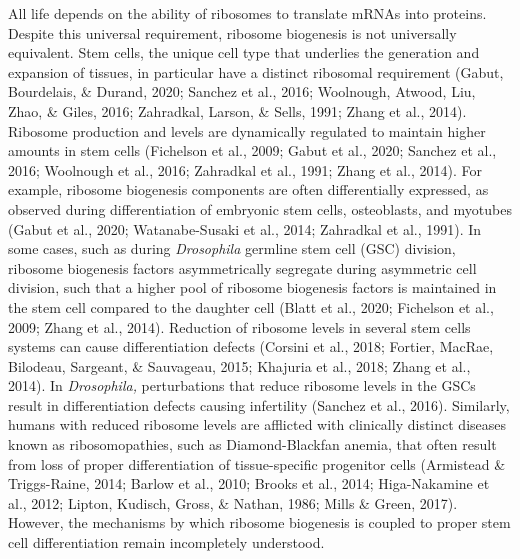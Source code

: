 \documentclass[12pt,twoside]{reedthesis}
\begin{document}
All life depends on the ability of ribosomes to translate mRNAs into
proteins. Despite this universal requirement, ribosome biogenesis is not
universally equivalent. Stem cells, the unique cell type that underlies
the generation and expansion of tissues, in particular have a distinct
ribosomal requirement (Gabut, Bourdelais, \& Durand, 2020; Sanchez et al., 2016; Woolnough, Atwood, Liu, Zhao, \& Giles, 2016; Zahradkal, Larson, \& Sells, 1991; Zhang et al., 2014). Ribosome
production and levels are dynamically regulated to maintain higher
amounts in stem cells (Fichelson et al., 2009; Gabut et al., 2020; Sanchez et al., 2016; Woolnough et al., 2016; Zahradkal et al., 1991; Zhang et al., 2014). For
example, ribosome biogenesis components are often differentially
expressed, as observed during differentiation of embryonic stem cells,
osteoblasts, and myotubes (Gabut et al., 2020; Watanabe-Susaki et al., 2014; Zahradkal et al., 1991). In
some cases, such as during \emph{Drosophila} germline stem cell (GSC)
division, ribosome biogenesis factors asymmetrically segregate during
asymmetric cell division, such that a higher pool of ribosome biogenesis
factors is maintained in the stem cell compared to the daughter cell
(Blatt et al., 2020; Fichelson et al., 2009; Zhang et al., 2014). Reduction of ribosome levels in several stem cells
systems can cause differentiation defects
(Corsini et al., 2018; Fortier, MacRae, Bilodeau, Sargeant, \& Sauvageau, 2015; Khajuria et al., 2018; Zhang et al., 2014). In \emph{Drosophila,} perturbations that reduce ribosome
levels in the GSCs result in differentiation defects causing infertility
(Sanchez et al., 2016). Similarly, humans with reduced ribosome levels are
afflicted with clinically distinct diseases known as ribosomopathies,
such as Diamond-Blackfan anemia, that often result from loss of proper
differentiation of tissue-specific progenitor cells (Armistead \& Triggs-Raine, 2014; Barlow et al., 2010; Brooks et al., 2014; Higa-Nakamine et al., 2012; Lipton, Kudisch, Gross, \& Nathan, 1986; Mills \& Green, 2017). However, the
mechanisms by which ribosome biogenesis is coupled to proper stem cell
differentiation remain incompletely understood.
\end{document}
